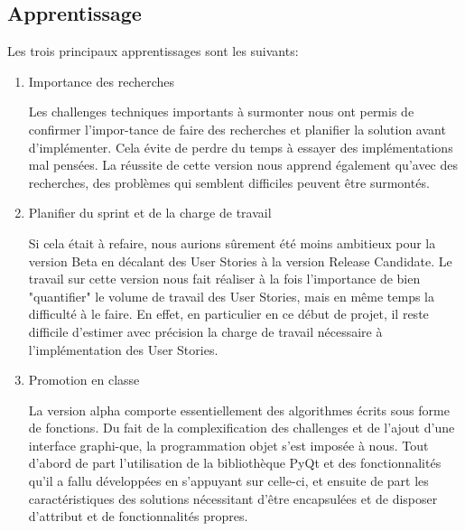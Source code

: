 \subsection{Apprentissage}

Les trois principaux apprentissages sont les suivants:

\begin{enumerate}
    \item Importance des recherches

          Les challenges techniques importants à surmonter nous ont permis de confirmer l’impor-tance de faire des recherches et
          planifier la solution avant d’implémenter. Cela évite de perdre du temps à essayer des implémentations mal pensées.
          La réussite de cette version nous apprend également qu’avec des recherches, des problèmes qui semblent difficiles
          peuvent être surmontés.
    \item Planifier du sprint et de la charge de travail

          Si cela était à refaire, nous aurions sûrement été moins ambitieux pour la version Beta en décalant des User Stories
          à la version Release Candidate. Le travail sur cette version nous fait réaliser à la fois l'importance de bien "quantifier"
          le volume de travail des User Stories, mais en même temps la difficulté à le faire. En effet, en particulier en ce début de projet,
          il reste difficile d’estimer avec précision la charge de travail nécessaire à l'implémentation des User Stories.

    \item Promotion en classe

          La version alpha comporte essentiellement des algorithmes écrits sous forme de fonctions. Du fait de la complexification
          des challenges et de l’ajout d’une interface graphi-que, la programmation objet s’est imposée à nous. Tout d’abord de part
          l’utilisation de la bibliothèque PyQt et des fonctionnalités qu’il a fallu développées en s’appuyant sur celle-ci, et ensuite
          de part les caractéristiques des solutions nécessitant d’être encapsulées et de disposer d’attribut et de fonctionnalités propres.

\end{enumerate}
